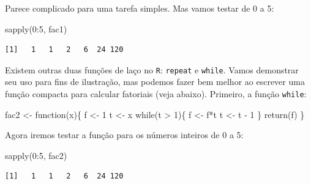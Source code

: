 \documentclass[
  letterpaper,
  DIV=11,
  numbers=noendperiod]{scrreprt}
\newenvironment{Shaded}{\begin{snugshade}}{\end{snugshade}}
\newcommand{\ControlFlowTok}[1]{\textcolor[rgb]{0.00,0.23,0.31}{#1}}
\newcommand{\DecValTok}[1]{\textcolor[rgb]{0.68,0.00,0.00}{#1}}
\newcommand{\FunctionTok}[1]{\textcolor[rgb]{0.28,0.35,0.67}{#1}}
\newcommand{\NormalTok}[1]{\textcolor[rgb]{0.00,0.23,0.31}{#1}}
\newcommand{\OtherTok}[1]{\textcolor[rgb]{0.00,0.23,0.31}{#1}}
\newcommand{\SpecialCharTok}[1]{\textcolor[rgb]{0.37,0.37,0.37}{#1}}
\begin{document}
Parece complicado para uma tarefa simples. Mas vamos testar de 0 a 5:

\begin{Shaded}
\begin{Highlighting}[]
\FunctionTok{sapply}\NormalTok{(}\DecValTok{0}\SpecialCharTok{:}\DecValTok{5}\NormalTok{, fac1)}
\end{Highlighting}
\end{Shaded}

\begin{verbatim}
[1]   1   1   2   6  24 120
\end{verbatim}

Existem outras duas funções de laço no \texttt{R}: \texttt{repeat} e
\texttt{while}. Vamos demonstrar seu uso para fins de ilustração, mas
podemos fazer bem melhor ao escrever uma função compacta para calcular
fatoriais (veja abaixo). Primeiro, a função \texttt{while}:

\begin{Shaded}
\begin{Highlighting}[]
\NormalTok{fac2 }\OtherTok{\textless{}{-}} \ControlFlowTok{function}\NormalTok{(x)\{}
\NormalTok{  f }\OtherTok{\textless{}{-}} \DecValTok{1}
\NormalTok{  t }\OtherTok{\textless{}{-}}\NormalTok{ x}
  \ControlFlowTok{while}\NormalTok{(t }\SpecialCharTok{\textgreater{}} \DecValTok{1}\NormalTok{)\{}
\NormalTok{    f }\OtherTok{\textless{}{-}}\NormalTok{ f}\SpecialCharTok{*}\NormalTok{t}
\NormalTok{    t }\OtherTok{\textless{}{-}}\NormalTok{ t }\SpecialCharTok{{-}} \DecValTok{1}
\NormalTok{  \}}
  \FunctionTok{return}\NormalTok{(f)}
\NormalTok{\}}
\end{Highlighting}
\end{Shaded}

Agora iremos testar a função para os números inteiros de 0 a 5:

\begin{Shaded}
\begin{Highlighting}[]
\FunctionTok{sapply}\NormalTok{(}\DecValTok{0}\SpecialCharTok{:}\DecValTok{5}\NormalTok{, fac2)}
\end{Highlighting}
\end{Shaded}

\begin{verbatim}
[1]   1   1   2   6  24 120
\end{verbatim}
\end{document}
